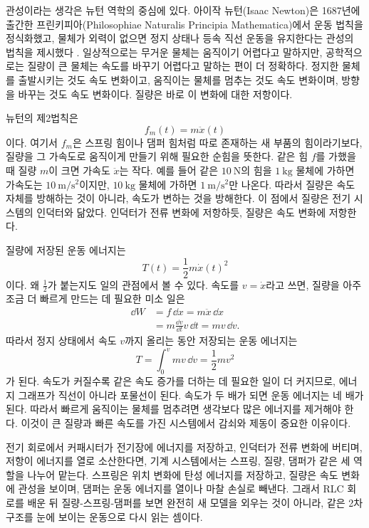 관성이라는 생각은 뉴턴 역학의 중심에 있다.
아이작 뉴턴(Isaac Newton)은 1687년에 출간한 프린키피아(Philosophiae Naturalis Principia Mathematica)에서 운동 법칙을 정식화했고, 물체가 외력이 없으면 정지 상태나 등속 직선 운동을 유지한다는 관성의 법칙을 제시했다 \cite{newton1687principia}.
일상적으로는 무거운 물체는 움직이기 어렵다고 말하지만, 공학적으로는 질량이 큰 물체는 속도를 바꾸기 어렵다고 말하는 편이 더 정확하다.
정지한 물체를 출발시키는 것도 속도 변화이고, 움직이는 물체를 멈추는 것도 속도 변화이며, 방향을 바꾸는 것도 속도 변화이다.
질량은 바로 이 변화에 대한 저항이다.

뉴턴의 제2법칙은
\begin{equation}
  f_m(t)=m\ddot{x}(t)
\end{equation}
이다.
여기서 $f_m$은 스프링 힘이나 댐퍼 힘처럼 따로 존재하는 새 부품의 힘이라기보다, 질량을 그 가속도로 움직이게 만들기 위해 필요한 순힘을 뜻한다.
같은 힘 $f$를 가했을 때 질량 $m$이 크면 가속도 $\ddot{x}$는 작다.
예를 들어 같은 $10~\mathrm{N}$의 힘을 $1~\mathrm{kg}$ 물체에 가하면 가속도는 $10~\mathrm{m/s^2}$이지만, $10~\mathrm{kg}$ 물체에 가하면 $1~\mathrm{m/s^2}$만 나온다.
따라서 질량은 속도 자체를 방해하는 것이 아니라, 속도가 변하는 것을 방해한다.
이 점에서 질량은 전기 시스템의 인덕터와 닮았다.
인덕터가 전류 변화에 저항하듯, 질량은 속도 변화에 저항한다.

질량에 저장된 운동 에너지는
\begin{equation}
  T(t)=\frac{1}{2}m\dot{x}(t)^2
\end{equation}
이다.
왜 $\frac{1}{2}$가 붙는지도 일의 관점에서 볼 수 있다.
속도를 $v=\dot{x}$라고 쓰면, 질량을 아주 조금 더 빠르게 만드는 데 필요한 미소 일은
\begin{align}
  \dd W
  &=
  f\,\dd x
  =
  m\ddot{x}\,\dd x \nonumber\\
  &=
  m\frac{\dd v}{\dd t}v\,\dd t
  =
  mv\,\dd v.
\end{align}
따라서 정지 상태에서 속도 $v$까지 올리는 동안 저장되는 운동 에너지는
\begin{equation}
  T=\int_0^v mv\,\dd v=\frac{1}{2}mv^2
\end{equation}
가 된다.
속도가 커질수록 같은 속도 증가를 더하는 데 필요한 일이 더 커지므로, 에너지 그래프가 직선이 아니라 포물선이 된다.
속도가 두 배가 되면 운동 에너지는 네 배가 된다.
따라서 빠르게 움직이는 물체를 멈추려면 생각보다 많은 에너지를 제거해야 한다.
이것이 큰 질량과 빠른 속도를 가진 시스템에서 감쇠와 제동이 중요한 이유이다.

전기 회로에서 커패시터가 전기장에 에너지를 저장하고, 인덕터가 전류 변화에 버티며, 저항이 에너지를 열로 소산한다면, 기계 시스템에서는 스프링, 질량, 댐퍼가 같은 세 역할을 나누어 맡는다.
스프링은 위치 변화에 탄성 에너지를 저장하고, 질량은 속도 변화에 관성을 보이며, 댐퍼는 운동 에너지를 열이나 마찰 손실로 빼낸다.
그래서 RLC 회로를 배운 뒤 질량-스프링-댐퍼를 보면 완전히 새 모델을 외우는 것이 아니라, 같은 2차 구조를 눈에 보이는 운동으로 다시 읽는 셈이다.

